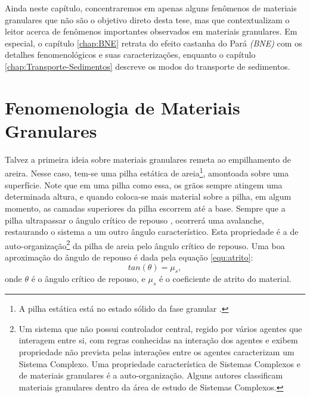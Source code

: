     Ainda neste capítulo, concentraremos em apenas alguns fenômenos de materiais granulares que não são o objetivo direto desta tese, mas que contextualizam o leitor acerca de fenômenos importantes observados em materiais granulares. Em especial, o capítulo \ref{chap:BNE} retrata do efeito castanha do Pará \textit{(BNE)} com os detalhes fenomenológicos e suas caracterizações, enquanto o capítulo \ref{chap:Transporte-Sedimentos} descreve os modos do transporte de sedimentos.

\section{Fenomenologia de Materiais Granulares}
\label{subchap:Fenomenologia}

    Talvez a primeira ideia sobre materiais granulares remeta ao empilhamento de areira. Nesse caso, tem-se uma pilha estática de areia\footnote{A pilha estática está no estado sólido da fase granular \cite{Granular_Solids_Liquids_and_Gases}.}, amontoada sobre uma superfície. Note que em uma pilha como essa, os grãos sempre atingem uma determinada altura, e quando coloca-se mais material sobre a pilha, em algum momento, as camadas superiores da pilha escorrem até a base. Sempre que a pilha ultrapassar o ângulo crítico de repouso \cite{Granular_Physics}, ocorrerá uma avalanche, restaurando o sistema a um outro ângulo característico. Esta propriedade é a de auto-organização\footnote{Um sistema que não possui controlador central, regido por vários agentes que interagem entre si, com regras conhecidas na interação dos agentes e exibem propriedade não prevista pelas interações entre os agentes caracterizam um Sistema Complexo. Uma propriedade característica de Sistemas Complexos e de materiais granulares é a auto-organização. Alguns autores \cite{Mixing_and_Segregation_of_Granular_Materials, Measuring_the_flowing_properties_of_powders_and_grains, Revisiting_localized_deformation_in_sand_with_complex_systems, Granular_matter_and_networks, Patterns_and_collective_behavior_in_granular_media} classificam materiais granulares dentro da área de estudo de Sistemas Complexos.} da pilha de areia pelo ângulo crítico de repouso. Uma boa aproximação do ângulo de repouso é dada pela equação \ref{equ:atrito}:
\begin{equation}
    \label{equ:atrito}
    tan(\theta) = \mu _s ,
\end{equation}
onde $\theta$ é o ângulo crítico de repouso, e $\mu _s$ é o coeficiente de atrito do material.

